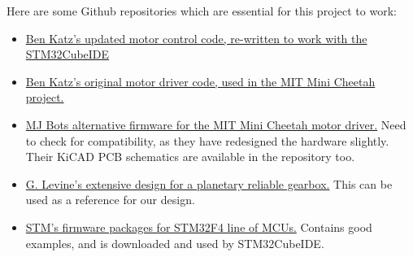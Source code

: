 \documentclass[a4paper]{article}
\begin{document}
		Here are some Github repositories which are essential for this project to work:
		\begin{itemize}
			\item \href{https://github.com/bgkatz/motorcontrol}{Ben Katz's updated motor control code, re-written to work with the STM32CubeIDE}
			\item \href{https://github.com/bgkatz/3phase_integrated}{Ben Katz's original motor driver code, used in the MIT Mini Cheetah project.}
			\item \href{https://github.com/mjbots/moteus}{MJ Bots alternative firmware for the MIT Mini Cheetah motor driver.} Need to check for compatibility, as they have redesigned the hardware slightly. Their KiCAD PCB schematics are available in the repository too.
			\item \href{https://github.com/G-Levine/OpenTorque-Actuator}{G. Levine's extensive design for a planetary reliable gearbox.} This can be used as a reference for our design.
			\item \href{https://github.com/STMicroelectronics/STM32CubeF4}{STM's firmware packages for STM32F4 line of MCUs.} Contains good examples, and is downloaded and used by STM32CubeIDE.
		\end{itemize}
\end{document}

